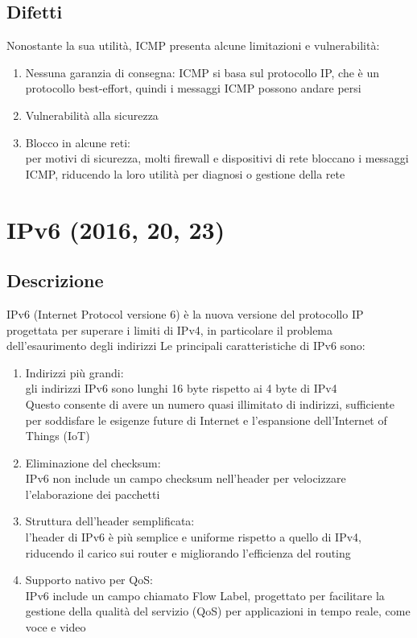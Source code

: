 \documentclass[10pt,oneside,a4paper]{article}
\begin{document}
\subsection{Difetti}
Nonostante la sua utilità, ICMP presenta alcune limitazioni e vulnerabilità:
\begin{enumerate}
\item Nessuna garanzia di consegna: ICMP si basa sul protocollo IP, che è un protocollo best-effort, quindi i messaggi ICMP possono andare persi
\item Vulnerabilità alla sicurezza
\item Blocco in alcune reti:\\
per motivi di sicurezza, molti firewall e dispositivi di rete bloccano i messaggi ICMP, riducendo la loro utilità per diagnosi o gestione della rete
\end{enumerate}
\section{IPv6 (2016, 20, 23)}
\subsection{Descrizione}
IPv6 (Internet Protocol versione 6) è la nuova versione del protocollo IP progettata per superare i limiti di IPv4, in particolare il problema dell'esaurimento degli indirizzi
Le principali caratteristiche di IPv6 sono:
\begin{enumerate}
\item Indirizzi più grandi:\\
gli indirizzi IPv6 sono lunghi 16 byte rispetto ai 4 byte di IPv4\\
Questo consente di avere un numero quasi illimitato di indirizzi, sufficiente per soddisfare le esigenze future di Internet e l'espansione dell'Internet of Things (IoT)
\item Eliminazione del checksum:\\
IPv6 non include un campo checksum nell'header per velocizzare l'elaborazione dei pacchetti
\item Struttura dell'header semplificata:\\
l'header di IPv6 è più semplice e uniforme rispetto a quello di IPv4, riducendo il carico sui router e migliorando l'efficienza del routing
\item Supporto nativo per QoS:\\
IPv6 include un campo chiamato Flow Label, progettato per facilitare la gestione della qualità del servizio (QoS) per applicazioni in tempo reale, come voce e video
\end{enumerate}
\end{document}
